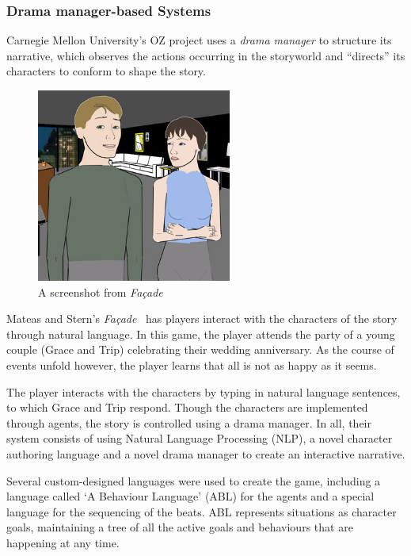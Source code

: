 \documentclass[11pt]{report}
\begin{document}
\subsubsection{Drama manager-based Systems}
\label{sec:drama-systems}

Carnegie Mellon University's OZ project \citep{mateas1999oz} uses a \emph{drama manager} to structure its narrative, which observes the actions occurring in the storyworld and ``directs'' its characters to conform to shape the story. 

\begin{figure}[!t]
\centerline{\includegraphics[height=2.5in]{facade.jpg}}
\caption{A screenshot from \emph{Fa\c{c}ade} \citep{mateas2003faccade}}\label{fig:mimesis}
\end{figure}

Mateas and Stern's \emph{Fa\c{c}ade}~\citep{mateas2003faccade} has players interact with the characters of the story through natural language. In this game, the player attends the party of a young couple (Grace and Trip) celebrating their wedding anniversary. As the course of events unfold however, the player learns that all is not as happy as it seems.

The player interacts with the characters by typing in natural language
sentences, to which Grace and Trip respond. Though the characters are
implemented through agents, the story is controlled using a drama manager. In
all, their system consists of using Natural Language Processing (NLP), a novel character authoring language and a novel drama manager to create an interactive narrative.

Several custom-designed languages were used to create the game, including a language called `A Behaviour Language' (ABL) for the agents and a special language for the sequencing of the beats. ABL represents situations as character goals, maintaining a tree of all the active goals and behaviours that are happening at any time.
\end{document}
